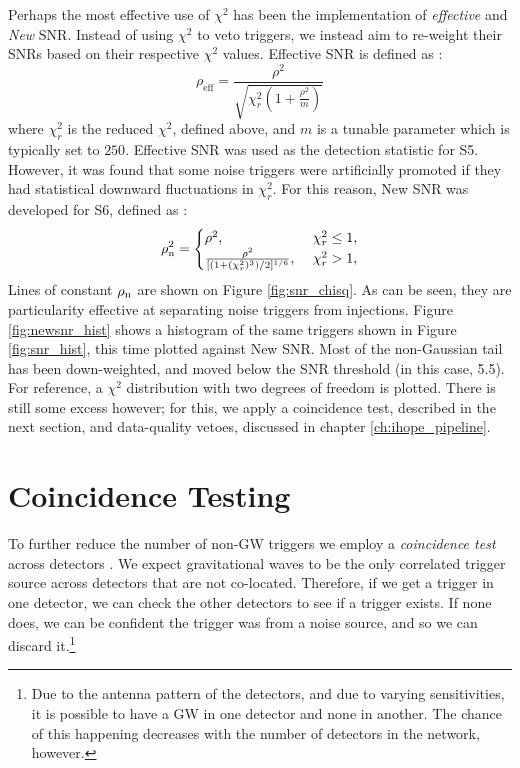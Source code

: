 Perhaps the most effective use of $\chi^2$ has been the implementation of \emph{effective} and \emph{New} \ac{SNR}. Instead of using $\chi^2$ to veto triggers, we instead aim to re-weight their \acp{SNR} based on their respective $\chi^2$ values. Effective \ac{SNR} is defined as \cite{Collaboration:2009tt}:
\begin{equation}
\label{eqn:effective_snr}
\rho_{\mathrm{eff}} = \frac{\rho^2}{\sqrt{\chi_r^2\left(1 + \frac{\rho^2}{m}\right)}}
\end{equation}
where $\chi_r^2$ is the reduced $\chi^2$, defined above, and $m$ is a tunable parameter which is typically set to $250$. Effective \ac{SNR} was used as the detection statistic for \ac{S5}. However, it was found that some noise triggers were artificially promoted if they had statistical downward fluctuations in $\chi_r^2$. For this reason, New \ac{SNR} was developed for \ac{S6}, defined as \cite{Collaboration:S6CBClowmass}:
\begin{equation}
\label{eqn:new_snr}
\rhonew^2 = \begin{cases}
 \rho^2, & \chi^2_{r} \leq 1, \\ 
 \frac{\rho^2}{[(1+(\chi_r^2)^3)/2]^{1/6}}, \ & \chi^2_{r} > 1,  \end{cases}  
\end{equation}
Lines of constant $\rho_{\mathrm{n}}$ are shown on Figure \ref{fig:snr_chisq}. As can be seen, they are particularity effective at separating noise triggers from injections. Figure \ref{fig:newsnr_hist} shows a histogram of the same triggers shown in Figure \ref{fig:snr_hist}, this time plotted against New \ac{SNR}. Most of the non-Gaussian tail has been down-weighted, and moved below the \ac{SNR} threshold (in this case, 5.5). For reference, a $\chi^2$ distribution with two degrees of freedom is plotted. There is still some excess however; for this, we apply a coincidence test, described in the next section, and data-quality vetoes, discussed in chapter \ref{ch:ihope_pipeline}.

\section{Coincidence Testing}
\label{sec:coincidence_test}

To further reduce the number of non-\ac{GW} triggers we employ a \emph{coincidence test} across detectors \cite{Brown, brown-2005-22}. We expect gravitational waves to be the only correlated trigger source across detectors that are not co-located. Therefore, if we get a trigger in one detector, we can check the other detectors to see if a trigger exists. If none does, we can be confident the trigger was from a noise source, and so we can discard it.\footnote{Due to the antenna pattern of the detectors, and due to varying sensitivities, it is possible to have a GW in one detector and none in another. The chance of this happening decreases with the number of detectors in the network, however.}


